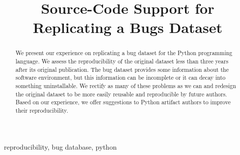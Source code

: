 \documentclass[conference]{IEEEtran}
\begin{document}
\title{Source-Code Support for Replicating a Bugs Dataset}

\author{
\and
{}
\and
{}
}

\maketitle

\begin{abstract}
  We present our experience on replicating a bug dataset for the Python programming language.
  We assess the reproducibility of the original dataset less than three years after its original publication.
  The bug dataset provides some information about the software environment, but this information can be incomplete or it can decay into something uninstallable.
  We rectify as many of these problems as we can and redesign the original dataset to be more easily reusable and reproducible by future authors.
  Based on our experience, we offer suggestions to Python artifact authors to improve their reproducibility. 
\end{abstract}

\begin{IEEEkeywords}
reproducibility, bug database, python
\end{IEEEkeywords}





\printbibliography
\end{document}
